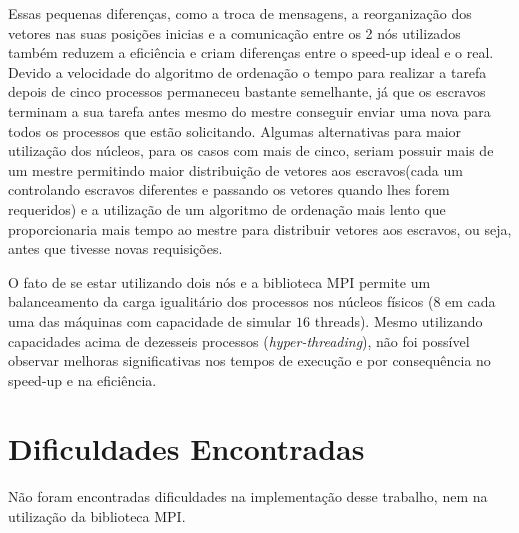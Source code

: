 \documentclass[11pt]{IEEEtran}
\begin{document}
	Essas pequenas diferenças, como a troca de mensagens, a reorganização dos
	vetores nas suas posições inicias e a comunicação entre os 2 nós utilizados
	também reduzem a eficiência e criam diferenças entre o speed-up ideal e o
	real. Devido a velocidade do algoritmo de ordenação o tempo para realizar a
	tarefa depois de cinco processos permaneceu bastante semelhante, já que os
	escravos terminam a sua tarefa antes mesmo do mestre conseguir enviar uma
	nova para todos os processos que estão solicitando.  Algumas alternativas
	para maior utilização dos núcleos, para os casos com mais de cinco, seriam
	possuir mais de um mestre permitindo maior distribuição de vetores aos
	escravos(cada um controlando escravos diferentes e passando os vetores
	quando lhes forem requeridos) e a utilização de um algoritmo de ordenação
	mais lento que proporcionaria mais tempo ao mestre para distribuir vetores
	aos escravos, ou seja, antes que tivesse novas requisições.

	O fato de se estar utilizando dois nós e a biblioteca MPI permite um
	balanceamento da carga igualitário dos processos nos núcleos físicos ($8$ em
	cada uma das máquinas com capacidade de simular $16$ threads). Mesmo
	utilizando capacidades acima de dezesseis processos
	(\emph{hyper-threading}), não foi possível observar melhoras significativas
	nos tempos de execução e por consequência no speed-up e na eficiência.

\section{Dificuldades Encontradas}

	Não foram encontradas dificuldades na implementação desse trabalho, nem na
	utilização da biblioteca MPI\@.
\end{document}

